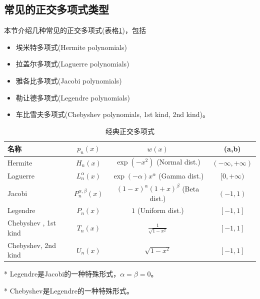\begin{subappendices}
\section{常见的正交多项式类型}
\label{eq:poly-orthogonality-types}
本节介绍几种常见的正交多项式(表格\ref{tab:poly-ortho-poly-classical})，包括
\begin{itemize}
  \item 埃米特多项式(Hermite polynomials)
  \item 拉盖尔多项式(Laguerre polynomials)
  \item 雅各比多项式(Jacobi polynomials)
  \item 勒让德多项式(Legendre polynomials)
  \item 车比雪夫多项式(Chebyshev polynomials, 1st kind, 2nd kind)。
\end{itemize}

\begin{table}[htbp]
  \label{tab:poly-ortho-poly-classical}
\begin{center}
    \scriptsize
    \def\arraystretch{1.2}
    \centering
    \caption{经典正交多项式}
    \begin{threeparttable}
    \begin{tabular}{lccc}
        \hline
        名称 & $p_n(x)$ & $w(x)$ & (a,b) \\
        \hline
        Hermite & $H_n(x)$ & $\exp(-x^2)$ (Normal dist.) & $(-\infty, + \infty)$ \\
        Laguerre & $L_n^{\alpha}(x)$ & $\exp(-\alpha) x^{\alpha}$ (Gamma dist.)& $ [0, +\infty)$ \\
        Jacobi & $P_n^{\alpha,\beta}(x)$ & $(1-x)^{\alpha} (1+x)^{\beta}$ (Beta dist.) & $(-1,1)$ \\
        Legendre\tnote{*} & $P_n(x)$ & $1$ (Uniform dist.)& $[-1,1]$ \\
        Chebyshev\tnote{**} , 1st kind & $T_n(x)$ & $\frac{1}{\sqrt{1-x^2}}$ & $\left[ -1,1 \right]$ \\
        Chebyshev, 2nd kind & $U_n(x)$ & $\sqrt{1-x^2}$ & $\left[ -1,1 \right]$ \\
        \hline
    \end{tabular}
    \begin{tablenotes}
        \footnotesize
        \item[*] Legendre是Jacobi的一种特殊形式，$\alpha = \beta = 0$。
        \item[*] Chebyshev是Legendre的一种特殊形式。
    \end{tablenotes}
\end{threeparttable}
\end{center}
\end{table}



\end{subappendices}
